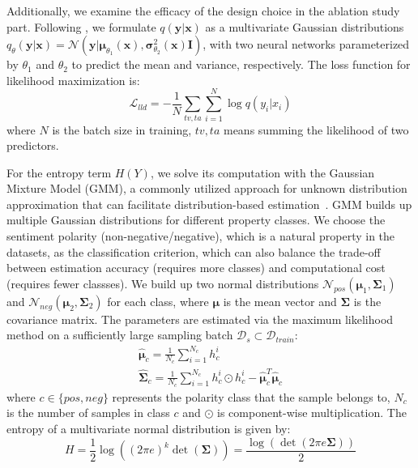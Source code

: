 \documentclass[11pt]{article}
\newcommand{\NN}{\mathcal{N}}
\begin{document}
Additionally, we examine the efficacy of the design choice in the ablation study part.
Following \citet{cheng2020club}, we formulate $q(\bm{y}|\bm{x})$ as a multivariate Gaussian distributions $q_{\theta}(\bm{y}|\bm{x})=\NN (\bm{y}|\bm{\mu}_{\theta_1}(\bm{x}),\bm{\sigma}^2_{\theta_2}(\bm{x})\bm{I})$, with two neural networks parameterized by $\theta_1$ and $\theta_2$ to predict the mean and variance, respectively. 
The loss function for likelihood maximization is:
\begin{equation} \label{lld}
    \mathcal{L}_{lld} = -\frac{1}{N}\sum_{tv,ta}\sum_{i=1}^N \log q(y_i|x_i)
\end{equation}
where $N$ is the batch size in training, $tv, ta$ means summing the likelihood of two predictors.

For the entropy term $H(Y)$, we solve its computation with the Gaussian Mixture Model (GMM), a commonly utilized approach for unknown distribution approximation that can facilitate distribution-based estimation~\citep{nilsson2002gaussian,kerroum2010textural}.
GMM builds up multiple Gaussian distributions for different property classes.
We choose the sentiment polarity (non-negative/negative), which is a natural property in the datasets, as the classification criterion, which can also balance the trade-off between estimation accuracy (requires more classes) and computational cost (requires fewer classses).
We build up two normal distributions $\mathcal{N}_{pos}(\bm{\mu}_1,\bm{\Sigma}_1)$ and $\mathcal{N}_{neg}(\bm{\mu}_2,\bm{\Sigma}_2)$ for each class, where $\bm{\mu}$ is the mean vector and $\bm{\Sigma}$ is the covariance matrix. 
The parameters are estimated via the maximum likelihood method on a sufficiently large sampling batch $\mathcal{D}_s \subset \mathcal{D}_{train}$:
\begin{equation}
\begin{gathered} 
    \hat{\bm{\mu}}_c = \frac{1}{N_c}\sum_{i=1}^{N_c}h^i_c \\
    \hat{\bm{\Sigma}}_c = \frac{1}{N_c}\sum_{i=1}^{N_c}h^i_c \odot h^i_c - \hat{\bm{\mu}}_c^T\hat{\bm{\mu}}_c
\end{gathered}
\label{Gest1}
\end{equation}
where $c \in \{pos,neg\}$ represents the polarity class that the sample belongs to, $N_c$ is the number of samples in class $c$ and $\odot$ is component-wise multiplication. 
The entropy of a multivariate normal distribution is given by:
\begin{equation} 
    H = \frac{1}{2} \log\left((2\pi e)^k\det(\bm{\Sigma})\right) = \frac{\log(\det(2\pi e\bm{\Sigma}))}{2}
\end{equation}
\end{document}
